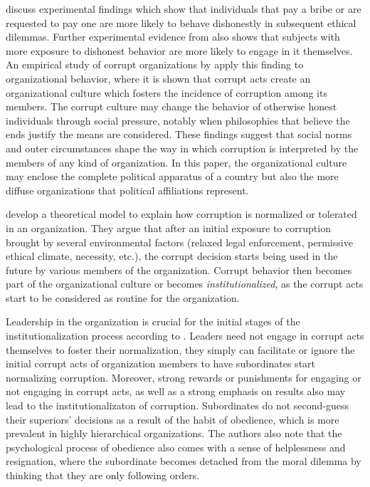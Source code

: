 \documentclass[floatsintext,man]{apa7}\usepackage[]{graphicx}\usepackage[]{color}
\begin{document}
\textcite{Ariely.2019} discuss experimental findings which show that individuals that pay a bribe or are requested to pay one are more likely to behave dishonestly in subsequent ethical dilemmas. Further experimental evidence from \textcite{Gino.2009} also shows that subjects with more exposure to dishonest behavior are more likely to engage in it themselves. An empirical study of corrupt organizations by \textcite{Campbell.2014} apply this finding to organizational behavior, where it is shown that corrupt acts create an organizational culture which fosters the incidence of corruption among its members. The corrupt culture may change the behavior of otherwise honest individuals through social pressure, notably when philosophies that believe the ends justify the means are considered. These findings suggest that social norms and outer circumstances shape the way in which corruption is interpreted by the members of any kind of organization. In this paper, the organizational culture may enclose the complete political apparatus of a country but also the more diffuse organizations that political affiliations represent. 

\textcite{Ashforth.2003} develop a theoretical model to explain how corruption is normalized or tolerated in an organization. They argue that after an initial exposure to corruption brought by several environmental factors (relaxed legal enforcement, permissive ethical climate, necessity, etc.), the corrupt decision starts being used in the future by various members of the organization. Corrupt behavior then becomes part of the organizational culture or becomes \textit{institutionalized}, as the corrupt acts start to be considered as routine for the organization.  

Leadership in the organization is crucial for the initial stages of the institutionalization process according to \textcite{Ashforth.2003}. Leaders need not engage in corrupt acts themselves to foster their normalization, they simply can facilitate or ignore the initial corrupt acts of organization members to have subordinates start normalizing corruption. Moreover, strong rewards or punishments for engaging or not engaging in corrupt acts, as well as a strong emphasis on results also may lead to the institutionalizaton of corruption. Subordinates do not second-guess their superiors' decisions as a result of the habit of obedience, which is more prevalent in highly hierarchical organizations. The authors also note that the psychological process of obedience also comes with a sense of helplessness and resignation, where the subordinate becomes detached from the moral dilemma by thinking that they are only following orders. 
\end{document}

